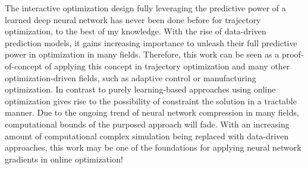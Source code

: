 The interactive optimization design fully leveraging the predictive power of a learned deep neural network has never been done before for trajectory optimization, to the best of my knowledge. With the rise of data-driven prediction models, it gains increasing importance to unleash their full predictive power in optimization in many fields. Therefore, this work can be seen as a proof-of-concept of applying this concept in trajectory optimization and many other optimization-driven fields, such as adaptive control or manufacturing optimization. In contrast to purely learning-based approaches using online optimization gives rise to the possibility of constraint the solution in a tractable manner. Due to the ongoing trend of neural network compression in many fields, computational bounds of the purposed approach will fade. With an increasing amount of computational complex simulation being replaced with data-driven approaches, this work may be one of the foundations for applying neural network gradients in online optimization!